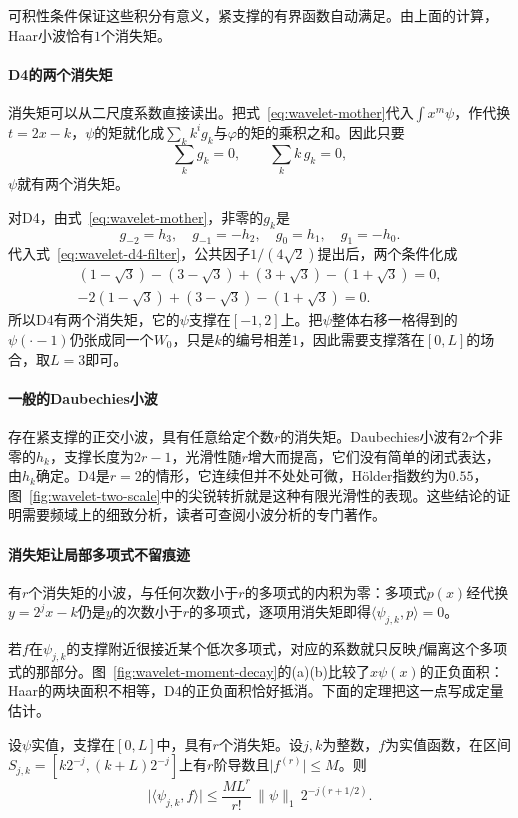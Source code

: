 可积性条件保证这些积分有意义，紧支撑的有界函数自动满足。由上面的计算，Haar小波恰有$1$个消失矩。

\paragraph{D4的两个消失矩}
消失矩可以从二尺度系数直接读出。把式~\eqref{eq:wavelet-mother}代入$\int x^m\psi$，作代换$t=2x-k$，$\psi$的矩就化成$\sum_kk^ig_k$与$\varphi$的矩的乘积之和。因此只要
\[
 \sum_kg_k=0,\qquad\sum_kk\,g_k=0,
\]
$\psi$就有两个消失矩。

对D4，由式~\eqref{eq:wavelet-mother}，非零的$g_k$是
\[
 g_{-2}=h_3,\quad g_{-1}=-h_2,\quad g_0=h_1,\quad g_1=-h_0.
\]
代入式~\eqref{eq:wavelet-d4-filter}，公共因子$1/(4\sqrt2)$提出后，两个条件化成
\begin{gather*}
 (1-\sqrt3)-(3-\sqrt3)+(3+\sqrt3)-(1+\sqrt3)=0,\\
 -2(1-\sqrt3)+(3-\sqrt3)-(1+\sqrt3)=0.
\end{gather*}
所以D4有两个消失矩，它的$\psi$支撑在$[-1,2]$上。把$\psi$整体右移一格得到的$\psi(\cdot-1)$仍张成同一个$W_0$，只是$k$的编号相差$1$，因此需要支撑落在$[0,L]$的场合，取$L=3$即可。

\paragraph{一般的Daubechies小波}
存在紧支撑的正交小波，具有任意给定个数$r$的消失矩。Daubechies小波有$2r$个非零的$h_k$，支撑长度为$2r-1$，光滑性随$r$增大而提高，它们没有简单的闭式表达，由$h_k$确定。D4是$r=2$的情形，它连续但并不处处可微，Hölder指数约为$0.55$，图~\ref{fig:wavelet-two-scale}中的尖锐转折就是这种有限光滑性的表现。这些结论的证明需要频域上的细致分析，读者可查阅小波分析的专门著作。

\paragraph{消失矩让局部多项式不留痕迹}
有$r$个消失矩的小波，与任何次数小于$r$的多项式的内积为零：多项式$p(x)$经代换$y=2^jx-k$仍是$y$的次数小于$r$的多项式，逐项用消失矩即得$\langle\psi_{j,k},p\rangle=0$。

若$f$在$\psi_{j,k}$的支撑附近很接近某个低次多项式，对应的系数就只反映$f$偏离这个多项式的那部分。图~\ref{fig:wavelet-moment-decay}的(a)(b)比较了$x\psi(x)$的正负面积：Haar的两块面积不相等，D4的正负面积恰好抵消。下面的定理把这一点写成定量估计。

\begin{theorem}[消失矩与系数衰减]
\label{thm:wavelet-moment-decay}
设$\psi$实值，支撑在$[0,L]$中，具有$r$个消失矩。设$j,k$为整数，$f$为实值函数，在区间$S_{j,k}=[k2^{-j},(k+L)2^{-j}]$上有$r$阶导数且$\lvert f^{(r)}\rvert\leq M$。则
\begin{equation}
 \lvert\langle\psi_{j,k},f\rangle\rvert\leq\frac{ML^r}{r!}\,\lVert\psi\rVert_1\,2^{-j(r+1/2)}.
 \label{eq:wavelet-moment-decay}
\end{equation}
\end{theorem}

